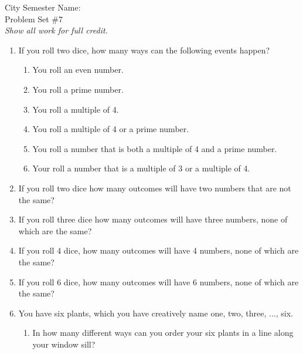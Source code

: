 \documentclass[12pt]{article}
\theoremstyle{plain}     %
\begin{document}
\large
City Semester  \hspace{8cm} Name:\makebox[6cm]{\hrulefill}
\\
Problem Set \#7\\
\normalsize 
\emph{Show all work for full credit.}\\
\begin{enumerate}
	\item If you roll two dice, how many ways can the following events happen?
		\begin{enumerate}
			\item You roll an even number.\\[1cm]
			\item You roll a prime number.\\[1cm]
			\item You roll a multiple of 4.\\[1cm]
			\item You roll a multiple of 4 or a prime number.\\[1cm]
			\item You roll a number that is both a multiple of 4 and a prime number.\\[1cm]
			\item Your roll a number that is a multiple of 3 or a multiple of 4.\\[1cm]
		\end{enumerate}
	\item If you roll two dice how many outcomes will have two numbers that are not the same?\\[1cm]
	\item If you roll three dice how many outcomes will have three numbers, none of which are the same?\\[1cm]
	\item If you roll 4 dice, how many outcomes will have 4 numbers, none of which are the same?\\[1cm]
	\item If you roll 6 dice, how many outcomes will have 6 numbers, none of which are the same?\\[1cm]
	\item You have six plants, which you have creatively name one, two, three, ..., six.
		\begin{enumerate}
			\item In how many different ways can you order your six plants in a line along your window sill?\\[1cm]

\end{enumerate}
\end{enumerate}
\end{document}
